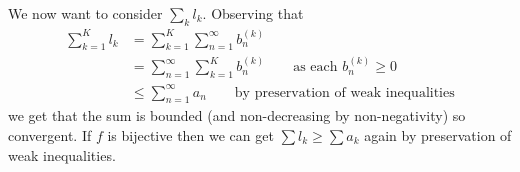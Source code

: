 \documentclass{tikzposter} %
\begin{document}
\begin{columns}
{    We now want to consider $\sum_{k} l_{k}$. Observing that
    \begin{align*}
      \sum_{k=1}^{K} l_{k} &= \sum_{k=1}^{K} \sum_{n=1}^{\infty} b_{n}^{(k)} \\
                        &= \sum_{n=1}^{\infty} \sum_{k=1}^{K} b_{n}^{(k)} \quad \quad \text{as each $b_{n}^{(k)} \ge 0$} \\
                        &\le \sum_{n=1}^{\infty} a_{n} \quad \quad \text{by preservation of weak inequalities}
    \end{align*}
    we get that the sum is bounded (and non-decreasing by non-negativity) so convergent. If $f$ is bijective then we can get $\sum l_{k} \ge \sum a_{k}$ again by preservation of weak inequalities.
    }
\end{columns}
\end{document}
